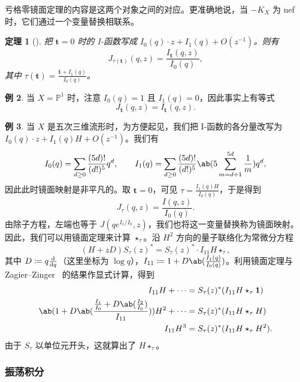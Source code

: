 \documentclass{amsart}
\newtheorem{thm}{定理}[section]
\theoremstyle{definition}
\newtheorem{exm}[thm]{例}
\theoremstyle{remark}
\theoremstyle{plain}
\theoremstyle{definition}
\theoremstyle{remark}
\renewcommand{\P}{\mathbb{P}}
\newcommand{\mbf}[1]{\mathbf{#1}}
\newcommand{\1}{\mathbf{1}}
\newcommand{\2}{\mathbf{2}}
\newcommand{\3}{\mathbf{3}}
\begin{document}
亏格零镜面定理的内容是这两个对象之间的对应。更准确地说，当 \(-K_X\) 为 nef 时，它们通过一个变量替换相联系。

\begin{thm}[{\cite{Givental1998,LLY1997}}]
    把 \(\mbf{t} = 0\) 时的 I-函数写成 \(I_0(q) \cdot z + I_1(q) + O(z^{-1})\)。则有
    \[
        J_{\tau(\mbf{t})}(q,z) = \frac{I_{\mbf{t}}(q,z)}{I_0(q)},
    \]
    其中 \(\tau(\mbf{t}) = \frac{\mbf{t} + I_1(q)}{I_0(q)}\)。
\end{thm}

\begin{exm}
    当 \(X = \P^1\) 时，注意 \(I_0(q) = 1\) 且 \(I_1(q) = 0\)，因此事实上有等式
    \[ J_{\mbf{t}}(q,z) = I_{\mbf{t}}(q,z). \]
\end{exm}

\begin{exm}
    当 \(X\) 是五次三维流形时，为方便起见，我们把 I-函数的各分量改写为 \(I_0(q) \cdot z + I_1(q)H + O(z^{-1})\)。我们有
    \[ I_0(q) = \sum_{d \geq 0} \frac{(5d)!}{(d!)^5} q^d, \qquad I_1(q) = \sum_{d \geq 0} \frac{(5d)!}{(d!)^5} \ab(5\sum_{m=d+1}^{5d} \frac{1}{m}) q^d, \]
    因此此时镜面映射是非平凡的。取 \(\mbf{t} = 0\)，可见 \(\tau = \frac{I_1(q)H}{I_0(q)}\)，于是得到
    \[ J_{\tau}(q,z) = \frac{I(q,z)}{I_0(q)}. \]
    由除子方程，左端也等于 \(J(qe^{I_1/I_0}, z)\)，我们也将这一变量替换称为镜面映射。
    因此，我们可以用镜面定理来计算 $\star_{\tau}$。沿 \(H^2\) 方向的量子联络化为常微分方程
    \[ (H+zD) S_{\tau}(z)^* = S_{\tau}(z)^* \cdot I_{11} H \star_{\tau}, \]
    其中 $D \coloneqq q \odv{}{q}$（这里坐标为 $\log q$），$I_{11} \coloneqq 1 + D \ab(\frac{I_1(q)}{I_0(q)})$。利用镜面定理与 Zagier--Zinger~\cite{ZagierZinger2008} 的结果作显式计算，得到
    \begin{align*}
        I_{11} H + \cdots &= S_{\tau}(z)^* (I_{11} H \star_{\tau} \1) \\
        \ab( 1 + D\ab(\frac{\frac{I_1}{I_0} + D \ab(\frac{I_2}{I_0})}{I_{11}}) ) H^2 + \cdots &= S_{\tau}(z)^* (I_{11} H \star_{\tau} H) \\
        I_{11} H^3 &= S_{\tau}(z)^* (I_{11}H \star_{\tau} H^2).
    \end{align*}
    由于 $S_{\tau}$ 以单位元开头，这就算出了 $H \star_{\tau}$。
\end{exm}

\subsubsection{振荡积分}%
\label{ssub:Oscillating integrals}
\end{document}
